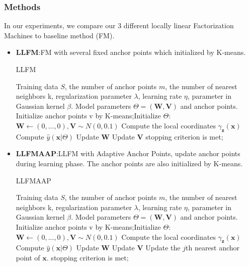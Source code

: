 \documentclass{article}
\begin{document}
\subsubsection{Methods}
In our experiments, we compare our 3 different locally linear Factorization Machines to baseline method (FM).
\begin{itemize}
	\item \textbf{LLFM}:FM with several fixed anchor points which initialized by K-means.
	\begin{algorithm}[H]
		\caption{LLFM}
		\begin{algorithmic}[1]
			\REQUIRE Training data $S$, the number of anchor points $m$, the number of nearest neighbors k, regularization parameter $\lambda$, learning rate $\eta$, parameter in Gaussian kernel $\beta$.
			\ENSURE Model parameters $\Theta = (\boldsymbol W, \boldsymbol V)$ and anchor points.
			\STATE Initialize anchor points v by K-means;Initialize $\Theta$:$\boldsymbol W\leftarrow(0,...,0),\boldsymbol V\sim N(0,0.1)$
			\REPEAT
			\STATE Compute the local coordinates $\gamma_{\boldsymbol{z}}(\boldsymbol{x})$
			\STATE Compute $\hat{y}(\boldsymbol{x}|\Theta)$
			\STATE Update $\boldsymbol W$
			\STATE Update $\boldsymbol V$
			\ENDFOR
			\UNTIL stopping criterion is met;
		\end{algorithmic}
	\end{algorithm}
	\item \textbf{LLFMAAP}:LLFM with Adaptive Anchor Points, update anchor points during learning phase. The anchor points are also initialized by K-means.
	\begin{algorithm}[H]
		\caption{LLFMAAP}
		\begin{algorithmic}[1]
			\REQUIRE Training data $S$, the number of anchor points $m$, the number of nearest neighbors k, regularization parameter $\lambda$, learning rate $\eta$, parameter in Gaussian kernel $\beta$.
			\ENSURE Model parameters $\Theta = (\boldsymbol W, \boldsymbol V)$ and anchor points.
			\STATE Initialize anchor points v by K-means;Initialize $\Theta$:$\boldsymbol W\leftarrow(0,...,0),\boldsymbol V\sim N(0,0.1)$
			\REPEAT
			\STATE Compute the local coordinates $\gamma_{\boldsymbol{z}}(\boldsymbol{x})$
			\STATE Compute $\hat{y}(\boldsymbol{x}|\Theta)$
			\STATE Update $\boldsymbol W$
			\STATE Update $\boldsymbol V$
			\STATE Update the $j$th nearest anchor point of $\boldsymbol{x}$.
			\ENDFOR
			\ENDFOR
			\UNTIL stopping criterion is met;
		\end{algorithmic}

\end{algorithm}
\end{itemize}
\end{document}
